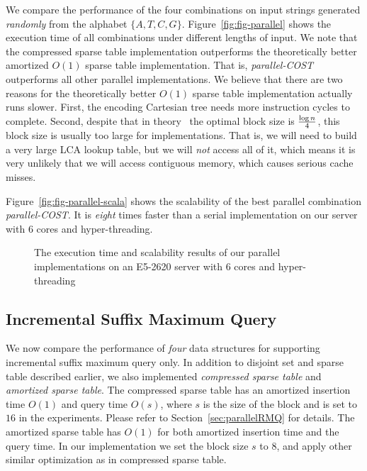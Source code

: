 We compare the performance of the four combinations on input strings
generated {\em randomly} from the alphabet $\{A, T, C, G\}$.
Figure~\ref{fig:fig-parallel} shows the execution time of all
combinations under different lengths of input.  We note that the
compressed sparse table implementation outperforms the theoretically
better amortized $O(1)$ sparse table implementation.  That is, {\em
  parallel-COST} outperforms all other parallel implementations.  We
believe that there are two reasons for the theoretically better $O(1)$
sparse table implementation actually runs slower.  First, the encoding
Cartesian tree needs more instruction cycles to complete.  Second,
despite that in theory~\cite{XXX} the optimal block size is ${\log
  n}\over{4}$, this block size is usually too large for implementations.
That is, we will need to build a very large LCA lookup table, but we
will {\em not} access all of it, which means it is very unlikely that
we will access contiguous memory, which causes serious cache misses.

Figure~\ref{fig:fig-parallel-scala} shows the scalability of the best
parallel combination {\em parallel-COST}.  It is {\em eight} times
faster than a serial implementation on our server with 6 cores and
hyper-threading.

\begin{figure}
  \centering
  \caption{The execution time and scalability results of our parallel
    implementations on an E5-2620 server with 6 cores and
    hyper-threading}
\end{figure}


\subsection{Incremental Suffix Maximum Query}

We now compare the performance of {\em four} data structures for
supporting incremental suffix maximum query only.  In addition to
disjoint set and sparse table described earlier, we also implemented
{\em compressed sparse table} and {\em amortized sparse table}.  The
compressed sparse table has an amortized insertion time $O(1)$ and
query time $O(s)$, where $s$ is the size of the block and is set to
$16$ in the experiments.  Please refer to
Section~\ref{sec:parallelRMQ} for details.  The amortized sparse table
has $O(1)$ for both amortized insertion time and the query time.  In
our implementation we set the block size $s$ to $8$, and apply other
similar optimization as in compressed sparse table.


